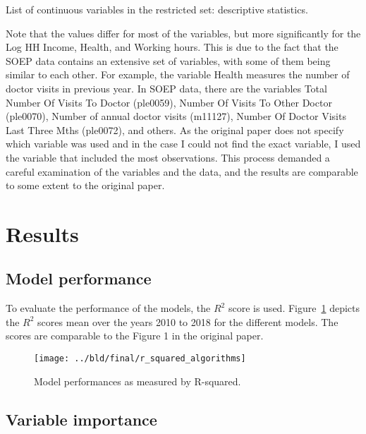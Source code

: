 \documentclass[11pt, a4paper, leqno]{article}
\begin{document}
\begin{table}[htbp]
    \centering
    
    \caption{List of continuous variables in the restricted set: descriptive statistics.}
    \label{tab:descriptive_stats_continuous}
\end{table}


Note that the values differ for most of the variables, but more significantly for the Log HH Income,
Health, and Working hours. This is due to the fact that the SOEP data contains an extensive
set of variables, with some of them being similar to each other. For example, the variable Health
measures the number of doctor visits in previous year. In SOEP data, there are the variables
Total Number Of Visits To Doctor (ple0059), Number Of Visits To Other Doctor (ple0070), Number of
annual doctor visits (m11127), Number Of Doctor Visits Last Three Mths (ple0072), and others.
As the original paper does not specify which variable was used and in the case I could not find
the exact variable, I used the variable that included the most observations. This process
demanded a careful examination of the variables and the data, and the results are comparable
to some extent to the original paper.



\section{Results} %
\label{sec:results}

\subsection{Model performance}

To evaluate the performance of the models, the $R^2$ score is used. Figure~\ref{fig:r_squared_algorithms}
depicts the $R^2$ scores mean over the years 2010 to 2018 for the different models. The scores are
comparable to the Figure 1 in the original paper.

\begin{figure}[htbp]
    \centering
    \texttt{[image: ../bld/final/r\_squared\_algorithms]}
    \caption{Model performances as measured by R-squared.}
    \label{fig:r_squared_algorithms}
\end{figure}


\subsection{Variable importance}
\end{document}
